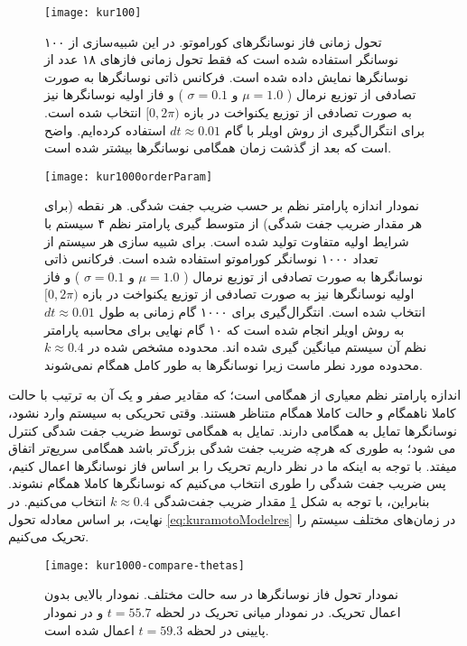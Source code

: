 \begin{figure}
	\centering
	\texttt{[image: kur100]}
    \caption{
تحول زمانی فاز نوسانگرهای کوراموتو. در این شبیه‌سازی از ۱۰۰ نوسانگر استفاده شده است که فقط تحول زمانی فازهای ۱۸ عدد از نوسانگرها نمایش داده شده است. فرکانس ذاتی نوسانگرها به صورت تصادفی از توزیع نرمال (
$\mu=1.0$  و $\sigma=0.1$
) و فاز اولیه نوسانگرها نیز به صورت تصادفی از توزیع یکنواخت در بازه 
$[0,2\pi)$
انتخاب شده است. برای انتگرال‌گیری از روش اویلر با گام 
$dt\approx 0.01$
استفاده کرده‌ایم. واضح است که بعد از گذشت زمان همگامی نوسانگرها بیشتر شده است.
    }
\end{figure}



\begin{figure}
	\centering
	\texttt{[image: kur1000orderParam]}
    \caption{
نمودار اندازه پارامتر نظم بر حسب ضریب جفت شدگی. هر نقطه (برای هر مقدار ضریب جفت شدگی) از متوسط گیری پارامتر نظم ۴ سیستم با شرایط اولیه متفاوت تولید شده است. برای شبیه سازی هر سیستم از تعداد ۱۰۰۰ نوسانگر کوراموتو استفاده شده است. فرکانس ذاتی نوسانگرها به صورت تصادفی از توزیع نرمال (
$\mu=1.0$  و $\sigma=0.1$
) و فاز اولیه نوسانگرها نیز به صورت تصادفی از توزیع یکنواخت در بازه 
$[0,2\pi)$
انتخاب شده است. انتگرال‌گیری برای ۱۰۰۰ گام زمانی به طول
 $dt \approx 0.01$
 به روش اویلر انجام شده است که ۱۰ گام نهایی برای محاسبه پارامتر نظم آن سیستم میانگین گیری شده اند. محدوده مشخص شده در 
 $k \approx 0.4$
 محدوده مورد نطر ماست زیرا نوسانگرها به طور کامل همگام نمی‌شوند.
    }
    \label{fig:orderParam-k}
\end{figure}

اندازه پارامتر نظم معیاری از همگامی است؛ که مقادیر صفر و یک آن به ترتیب با حالت کاملا ناهمگام و حالت کاملا همگام متناظر هستند. وقتی تحریکی به سیستم وارد نشود، نوسانگرها تمایل به همگامی دارند. تمایل به همگامی توسط ضریب جفت شدگی کنترل می شود؛ به طوری که هرچه ضریب جفت شدگی بزرگ‌تر باشد همگامی سریع‌تر اتفاق میفتد. با توجه به اینکه ما در نظر داریم تحریک‌ را بر اساس فاز نوسانگرها اعمال کنیم، پس ضریب جفت شدگی را طوری انتخاب می‌کنیم که نوسانگرها کاملا همگام نشوند. بنابراین، با توجه به شکل 
\ref{fig:orderParam-k}
مقدار ضریب جفت‌شدگی 
$k \approx 0.4$
انتخاب می‌کنیم. در نهایت، بر اساس معادله تحول 
\ref{eq:kuramotoModelres}
در زمان‌های مختلف سیستم را تحریک می‌کنیم.

\begin{figure}
	\centering
	\texttt{[image: kur1000-compare-thetas]}
    \caption{
نمودار تحول فاز نوسانگرها در سه حالت مختلف. نمودار بالایی بدون اعمال تحریک. در نمودار میانی تحریک در لحظه 
$t=55.7$
و در نمودار پایینی در لحظه 
$t=59.3$
اعمال شده است.
    }
    \label{fig:kur-compare-thetas}
\end{figure}

